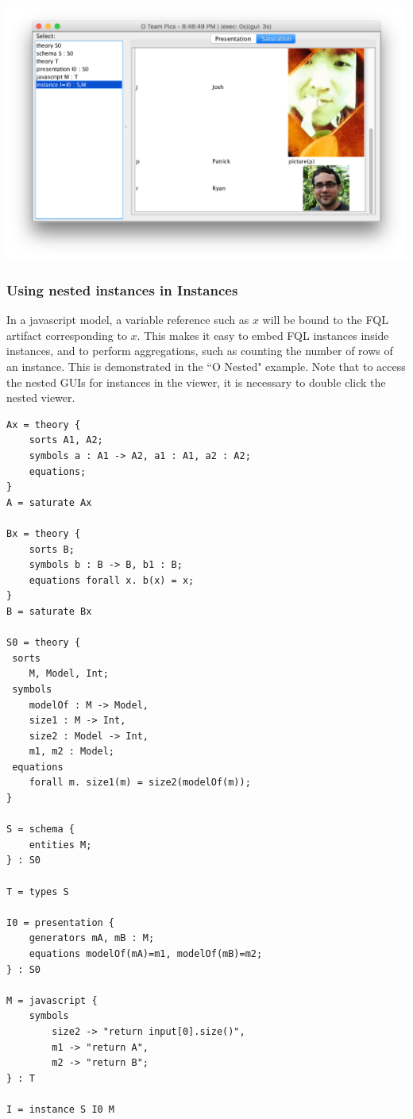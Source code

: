 \documentclass[12pt]{article}
\begin{document}
\begin{center}
\includegraphics[width=6in]{team}
\end{center}

\subsubsection{Using nested instances in Instances}

In a javascript model, a variable reference such as $x$ will be bound to the FQL artifact corresponding to $x$.  This makes it easy to embed FQL instances inside instances, and to perform aggregations, such as counting the number of rows of an instance.  This is demonstrated in the ``O Nested" example.  Note that to access the nested GUIs for instances in the viewer, it is necessary to double click the nested viewer.

\begin{verbatim}
Ax = theory {
	sorts A1, A2;
	symbols a : A1 -> A2, a1 : A1, a2 : A2;
	equations;
}
A = saturate Ax

Bx = theory {
	sorts B;
	symbols b : B -> B, b1 : B;
	equations forall x. b(x) = x;
}
B = saturate Bx

S0 = theory { 
 sorts
 	M, Model, Int;
 symbols
 	modelOf : M -> Model, 
 	size1 : M -> Int,
 	size2 : Model -> Int,
 	m1, m2 : Model;
 equations
 	forall m. size1(m) = size2(modelOf(m));
}

S = schema {
	entities M;	
} : S0

T = types S

I0 = presentation {
	generators mA, mB : M;
	equations modelOf(mA)=m1, modelOf(mB)=m2;
} : S0

M = javascript {
	symbols
		size2 -> "return input[0].size()",
		m1 -> "return A",
		m2 -> "return B";			
} : T

I = instance S I0 M
\end{verbatim}
\end{document}
